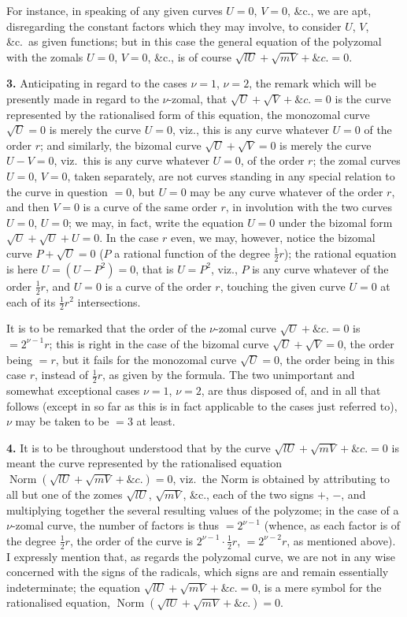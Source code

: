 \documentclass[11pt,a4paper]{article}
\theoremstyle{definition}
\DeclareMathOperator{\Norm}{Norm}
\begin{document}
For instance, in speaking of any given curves $U=0$, $V=0$, \&c., we are apt, disregarding the constant factors which they may involve, to consider $U$, $V$, \&c.\ as given functions; but in this case the general equation of the polyzomal with the zomals $U=0$, $V=0$, \&c., is of course $\sqrt{lU}+\sqrt{mV}+\&c.=0$.

\noindent\textbf{3.} Anticipating in regard to the cases $\nu=1$, $\nu=2$, the remark which will be presently made in regard to the $\nu$-zomal, that $\sqrt{U}+\sqrt{V}+\&c.=0$ is the curve represented by the rationalised form of this equation, the monozomal curve $\sqrt{U}=0$ is merely the curve $U=0$, viz., this is any curve whatever $U=0$ of the order $r$; and similarly, the bizomal curve $\sqrt{U}+\sqrt{V}=0$ is merely the curve $U-V=0$, viz.\ this is any curve whatever $U=0$, of the order $r$; the zomal curves $U=0$, $V=0$, taken separately, are not curves standing in any special relation to the curve in question $=0$, but $U=0$ may be any curve whatever of the order $r$, and then $V=0$ is a curve of the same order $r$, in involution with the two curves $U=0$, $U=0$; we may, in fact, write the equation $U=0$ under the bizomal form $\sqrt{U}+\sqrt{U}+U=0$. In the case $r$ even, we may, however, notice the bizomal curve $P+\sqrt{U}=0$ ($P$ a rational function of the degree $\frac{1}{2}r$); the rational equation is here $U=(U-P^2)=0$, that is $U=P^2$, viz., $P$ is any curve whatever of the order $\frac{1}{2}r$, and $U=0$ is a curve of the order $r$, touching the given curve $U=0$ at each of its $\frac{1}{2}r^2$ intersections.

\setcounter{page}{474}

It is to be remarked that the order of the $\nu$-zomal curve $\sqrt{U}+\&c.=0$ is $=2^{\nu-1}r$; this is right in the case of the bizomal curve $\sqrt{U}+\sqrt{V}=0$, the order being $=r$, but it fails for the monozomal curve $\sqrt{U}=0$, the order being in this case $r$, instead of $\frac{1}{2}r$, as given by the formula. The two unimportant and somewhat exceptional cases $\nu=1$, $\nu=2$, are thus disposed of, and in all that follows (except in so far as this is in fact applicable to the cases just referred to), $\nu$ may be taken to be $=3$ at least.

\noindent\textbf{4.} It is to be throughout understood that by the curve $\sqrt{lU}+\sqrt{mV}+\&c.=0$ is meant the curve represented by the rationalised equation $\Norm(\sqrt{lU}+\sqrt{mV}+\&c.)=0$, viz.\ the Norm is obtained by attributing to all but one of the zomes $\sqrt{lU}$, $\sqrt{mV}$, \&c., each of the two signs $+$, $-$, and multiplying together the several resulting values of the polyzome; in the case of a $\nu$-zomal curve, the number of factors is thus $=2^{\nu-1}$ (whence, as each factor is of the degree $\frac{1}{2}r$, the order of the curve is $2^{\nu-1}\cdot\frac{1}{2}r$, $=2^{\nu-2}r$, as mentioned above). I expressly mention that, as regards the polyzomal curve, we are not in any wise concerned with the signs of the radicals, which signs are and remain essentially indeterminate; the equation $\sqrt{lU}+\sqrt{mV}+\&c.=0$, is a mere symbol for the rationalised equation, $\Norm(\sqrt{lU}+\sqrt{mV}+\&c.)=0$.
\end{document}
